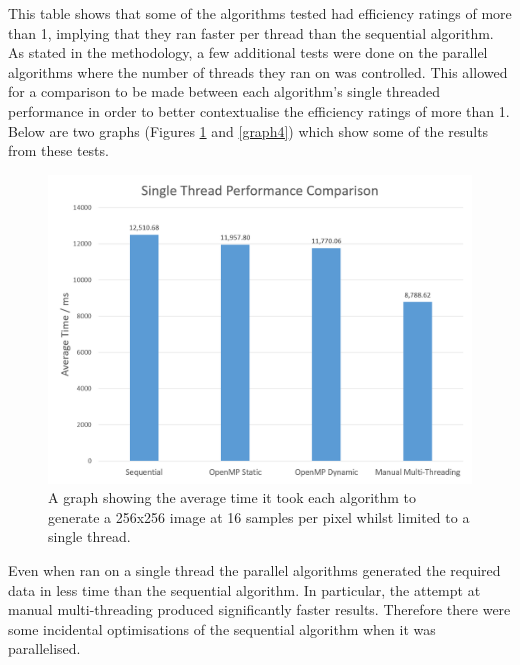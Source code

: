 \documentclass[12pt,journal,transmag]{IEEEtran}
\begin{document}
	This table shows that some of the algorithms tested had efficiency ratings of more than 1, implying that they ran faster per thread than the sequential algorithm. As stated in the methodology, a few additional tests were done on the parallel algorithms where the number of threads they ran on was controlled. This allowed for a comparison to be made between each algorithm's single threaded performance in order to better contextualise the efficiency ratings of more than 1. Below are two graphs (Figures \ref{graph3} and \ref{graph4}) which show some of the results from these tests.

	\begin{figure}[!h]
		\centering
		\includegraphics[width=\columnwidth]{IMAGES/singlethreadperformance}
		\caption{A graph showing the average time it took each algorithm to generate a 256x256 image at 16 samples per pixel whilst limited to a single thread.}
		\label{graph3}
	\end{figure}

	Even when ran on a single thread the parallel algorithms generated the required data in less time than the sequential algorithm. In particular, the attempt at manual multi-threading produced significantly faster results. Therefore there were some incidental optimisations of the sequential algorithm when it was parallelised.
\end{document}
